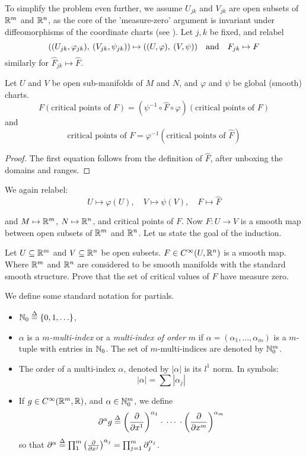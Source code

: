 \documentclass[../main-manifolds.tex]{subfiles}
\begin{document}
To simplify the problem even further, we assume $U_{jk}$ and $V_{jk}$ are open subsets of ${\mathbb{R}^m}$ and ${\mathbb{R}^n}$, as the core of the 'measure-zero' argument is invariant under diffeomorphisms of the coordinate charts (see ). Let $j,k$ be fixed, and relabel
\[
    ((U_{jk},\varphi_{jk}),\: (V_{jk},\psi_{jk}))\mapsto ((U,\varphi),\: (V,\psi))\qqtext{and} F_{jk}\mapsto F
\]
similarly for $\hat{F}_{jk}\mapsto \hat{F}$.

\begin{step}
    Let $U$ and $V$ be open sub-manifolds of $M$ and $N$, and $\varphi$ and $\psi$ be global (smooth) charts.
    \[
        F(\text{critical points of } F) = (\psi^{-1}\circ \hat{F}\circ \varphi)(\text{critical points of }F)
    \]
    and
    \[
        \text{critical points of }F = \varphi^{-1}(\text{critical points of } \hat{F})
    \]
\end{step}
\begin{proof}
    The first equation follows from the definition of $\hat{F}$, after unboxing the domains and ranges.
\end{proof}
We again relabel:
\[
    U\mapsto \varphi(U),\quad V\mapsto \psi(V),\quad F\mapsto \hat{F}
\]

and $M\mapsto {\mathbb{R}^m}$, $N\mapsto {\mathbb{R}^n}$, and critical points of $F$. Now $F: U\to V$ is a smooth map between open subsets of ${\mathbb{R}^m}$ and ${\mathbb{R}^n}$. Let us state the goal of the induction.
\begin{step}\label{lee-sards-simplified-induction-hypothesis}
    Let $U\subseteq{\mathbb{R}^m}$ and $V\subseteq{\mathbb{R}^n}$ be open subsets. $F\in\cinf[U,\realn]$ is a smooth map. Where ${\mathbb{R}^m}$ and ${\mathbb{R}^n}$ are considered to be smooth manifolds with the standard smooth structure. Prove that the set of critical values of $F$ have measure zero.
\end{step}

We define some standard notation for partials.
\begin{itemize}
    \item $\mathbb{N}_0\overset{\Delta}{=}\{0,1,\ldots\}$,
    \item $\alpha$ is a \emph{$m$-multi-index} or a \emph{multi-index of order $m$} if $\alpha = (\alpha_1,\ldots,\alpha_m)$ is a $m$-tuple with entries in $\mathbb{N}_0$. The set of $m$-multi-indices are denoted by $\mathbb{N}_0^m$.
    \item The order of a multi-index $\alpha$, denoted by $|\alpha|$ is its $l^1$ norm. In symbols:
    \[
        |\alpha|=\sum |\alpha_j|
    \]
    \item If $g\in\cinf[\realm,\real]$, and $\alpha\in\mathbb{N}_0^m$, we define 
    \[
        \partial^\alpha g\overset{\Delta}{=} \qty(\pdv{x^1})^{\alpha_1}\cdot\:\cdots\:\cdot\qty(\pdv{x^m})^{\alpha_m}
    \]
    so that $\partial^\alpha \overset{\Delta}{=} \prod_{1}^m\qty(\pdv{x^j})^{\alpha_j} = \prod_{j=1}^m\partial_j^{\alpha_j}$.
\end{itemize}
\end{document}
